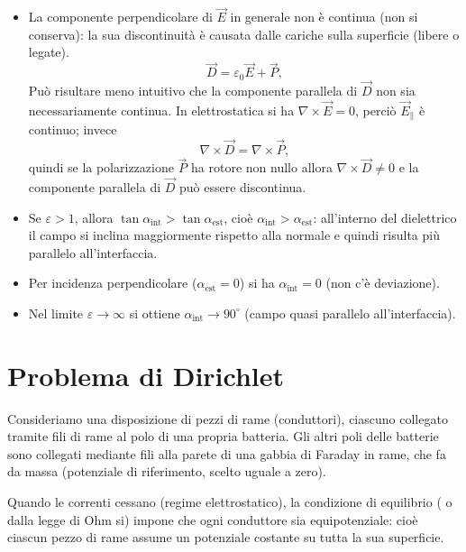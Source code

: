\documentclass{book}
\begin{document}

\begin{itemize}
\item{La componente perpendicolare di \(\vec{E}\)  in generale non è continua (non si conserva): la sua discontinuità è causata dalle cariche sulla superficie (libere o legate). 
\[
\vec{D}=\varepsilon_0\vec{E}+\vec{P},
\]
Può risultare meno intuitivo che la componente parallela di \(\vec{D}\) non sia necessariamente continua. In elettrostatica si ha \(\nabla\times\vec{E}=0\), perciò \(\vec{E}_{\parallel}\) è continuo; invece
\[
\nabla\times\vec{D}=\nabla\times\vec{P},
\]
quindi se la polarizzazione \(\vec{P}\) ha rotore non nullo allora \(\nabla\times\vec{D}\neq 0\) e la componente parallela di \(\vec{D}\) può essere discontinua.}

  \item Se $\varepsilon>1$, allora $\tan\alpha_{\text{int}}>\tan\alpha_{\text{est}}$, cioè $\alpha_{\text{int}}>\alpha_{\text{est}}$: all'interno del dielettrico il campo si inclina maggiormente rispetto alla normale e quindi risulta più parallelo all'interfaccia.
  \item Per incidenza perpendicolare ($\alpha_{\text{est}}=0$) si ha $\alpha_{\text{int}}=0$ (non c'è deviazione).
  \item Nel limite $\varepsilon\to\infty$ si ottiene $\alpha_{\text{int}}\to 90^\circ$ (campo quasi parallelo all'interfaccia).
\end{itemize}


\section{Problema di Dirichlet}

Consideriamo una disposizione di pezzi di rame (conduttori), ciascuno collegato tramite fili di rame al polo di una propria batteria. Gli altri poli delle batterie sono collegati mediante fili alla parete di una gabbia di Faraday in rame, che fa da massa (potenziale di riferimento, scelto uguale a zero).

Quando le correnti cessano (regime elettrostatico), la condizione di equilibrio ( o dalla legge di Ohm si) impone che ogni conduttore sia equipotenziale: cioè ciascun pezzo di rame assume un potenziale costante su tutta la sua superficie.

\medskip
\end{document}
